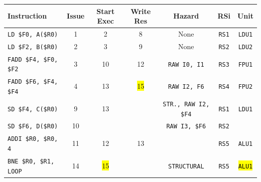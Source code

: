 \begin{enumerate}
    \begin{table}[!htp]
        \centering
        \begin{adjustbox}{width={\textwidth},totalheight={\textheight},keepaspectratio}
        \begin{tabular}{@{} l c c c c c c @{}}
            \toprule
            \textbf{Instruction} & \textbf{Issue} & \textbf{Start Exec} & \textbf{Write Res} & \textbf{Hazard} & \textbf{RSi} & \textbf{Unit} \\
            \midrule
            \texttt{LD \$F0, A(\$R0)}       & 1 & 2 & 8 & None  & \texttt{RS1}   & \texttt{LDU1}  \\ [.5em]
            \texttt{LD \$F2, B(\$R0)}       & 2 & 3 & 9 & None  & \texttt{RS2}   & \texttt{LDU2}  \\ [.5em]
            \texttt{FADD \$F4, \$F0, \$F2}  & 3 & 10 & 12 & \texttt{RAW I0, I1} & \texttt{RS3} & \texttt{FPU1} \\ [.5em]
            \texttt{FADD \$F6, \$F4, \$F4}  & 4 & 13 & \hl{15} & \texttt{RAW I2, F6} & \texttt{RS4} & \texttt{FPU2} \\ [.5em]
            \texttt{SD \$F4, C(\$R0)}       & 9 & 13 &   & \texttt{STR., RAW I2, \$F4} & \texttt{RS1} & \texttt{LDU1} \\ [.5em]
            \texttt{SD \$F6, D(\$R0)}       & 10 &   &   & \texttt{RAW I3, \$F6} & \texttt{RS2} &       \\ [.5em]
            \texttt{ADDI \$R0, \$R0, 4}     & 11 & 12 & 13 &       & \texttt{RS5} & \texttt{ALU1} \\ [.5em]
            \texttt{BNE \$R0, \$R1, LOOP}   & 14 & \hl{15} &   & \texttt{STRUCTURAL} & \texttt{RS5} & \hl{\texttt{ALU1}} \\
            \bottomrule
        \end{tabular}
        \end{adjustbox}
    \end{table}
    

\end{enumerate}
